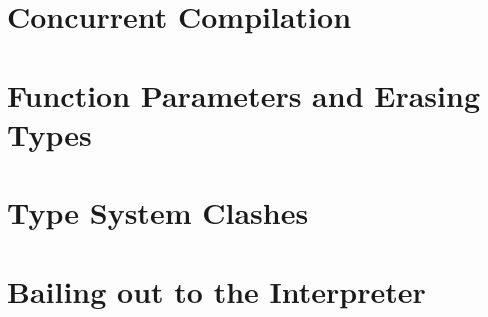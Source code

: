 
\section{Concurrent Compilation}


\section{Function Parameters and Erasing Types}



\section{Type System Clashes}


\section{Bailing out to the Interpreter}


